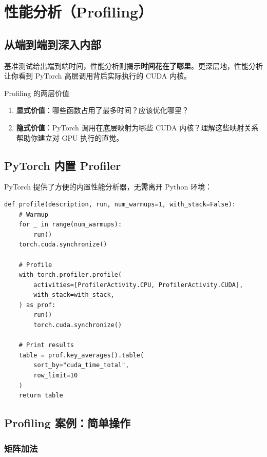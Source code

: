 \section{性能分析（Profiling）}

\subsection{从端到端到深入内部}

基准测试给出端到端时间，性能分析则揭示\textbf{时间花在了哪里}。更深层地，性能分析让你看到 PyTorch 高层调用背后实际执行的 CUDA 内核。

\begin{importantbox}{Profiling 的两层价值}
\begin{enumerate}
    \item \textbf{显式价值}：哪些函数占用了最多时间？应该优化哪里？
    \item \textbf{隐式价值}：PyTorch 调用在底层映射为哪些 CUDA 内核？理解这些映射关系帮助你建立对 GPU 执行的直觉。
\end{enumerate}
\end{importantbox}

\subsection{PyTorch 内置 Profiler}

PyTorch 提供了方便的内置性能分析器，无需离开 Python 环境：

\begin{lstlisting}[caption={PyTorch Profiler 使用模板}]
def profile(description, run, num_warmups=1, with_stack=False):
    # Warmup
    for _ in range(num_warmups):
        run()
    torch.cuda.synchronize()

    # Profile
    with torch.profiler.profile(
        activities=[ProfilerActivity.CPU, ProfilerActivity.CUDA],
        with_stack=with_stack,
    ) as prof:
        run()
        torch.cuda.synchronize()

    # Print results
    table = prof.key_averages().table(
        sort_by="cuda_time_total",
        row_limit=10
    )
    return table
\end{lstlisting}

\subsection{Profiling 案例：简单操作}

\subsubsection{矩阵加法}

